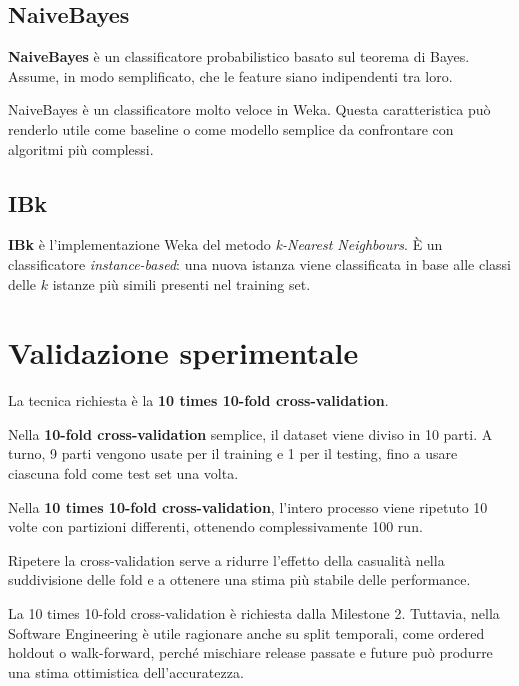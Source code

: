 \subsection{NaiveBayes}

\textbf{NaiveBayes} è un classificatore probabilistico basato sul teorema di Bayes. Assume, in modo semplificato, che le feature siano indipendenti tra loro.

\begin{notaprof}
NaiveBayes è un classificatore molto veloce in Weka. Questa caratteristica può renderlo utile come baseline o come modello semplice da confrontare con algoritmi più complessi.
\end{notaprof}

\subsection{IBk}

\textbf{IBk} è l'implementazione Weka del metodo \emph{k-Nearest Neighbours}. È un classificatore \emph{instance-based}: una nuova istanza viene classificata in base alle classi delle \(k\) istanze più simili presenti nel training set.

\section{Validazione sperimentale}

La tecnica richiesta è la \textbf{10 times 10-fold cross-validation}.

Nella \textbf{10-fold cross-validation} semplice, il dataset viene diviso in 10 parti. A turno, 9 parti vengono usate per il training e 1 per il testing, fino a usare ciascuna fold come test set una volta.

Nella \textbf{10 times 10-fold cross-validation}, l'intero processo viene ripetuto 10 volte con partizioni differenti, ottenendo complessivamente 100 run.

Ripetere la cross-validation serve a ridurre l'effetto della casualità nella suddivisione delle fold e a ottenere una stima più stabile delle performance.

\begin{notaesame}
La 10 times 10-fold cross-validation è richiesta dalla Milestone 2. Tuttavia, nella Software Engineering è utile ragionare anche su split temporali, come ordered holdout o walk-forward, perché mischiare release passate e future può produrre una stima ottimistica dell'accuratezza.
\end{notaesame}

